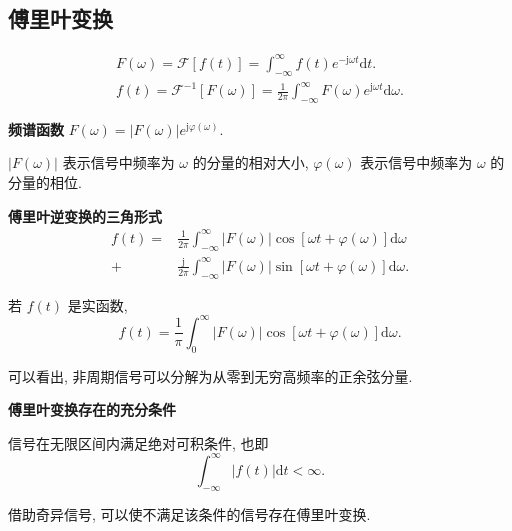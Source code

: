 \subsection{傅里叶变换} \label{3 傅里叶变换}
\rmg
\begin{gather}
    F(\omega)=\mathcal{F}[f(t)]=\int_{-\infty}^{\infty}f(t)e^{-\mathrm{j}\omega t}\mathrm{d}t. \label{eq:3.3 fourier} \\
    f(t)=\mathcal{F}^{-1}[F(\omega)]=\frac{1}{2\pi}\int_{-\infty}^{\infty}F(\omega)e^{\mathrm{j}\omega t}\mathrm{d}\omega.
\end{gather}

\textbf{频谱函数} $F(\omega)=|F(\omega)|e^{\mathrm{j}\varphi(\omega)}$.

$|F(\omega)|$ 表示信号中频率为 $\omega$ 的分量的相对大小, $\varphi(\omega)$ 表示信号中频率为 $\omega$ 的分量的相位.

\textbf{傅里叶逆变换的三角形式}
\begin{equation}
    \begin{aligned}
        f(t)= & \frac{1}{2\pi}\int_{-\infty}^{\infty}|F(\omega)|\cos[\omega t+\varphi(\omega)]\mathrm{d}\omega           \\
        +     & \frac{\mathrm{j}}{2\pi}\int_{-\infty}^{\infty}|F(\omega)|\sin[\omega t+\varphi(\omega)]\mathrm{d}\omega.
    \end{aligned}
\end{equation}

若 $f(t)$ 是实函数,
\begin{equation}
    f(t)=\frac{1}{\pi}\int_{0}^{\infty}|F(\omega)|\cos[\omega t+\varphi(\omega)]\mathrm{d}\omega.
\end{equation}

可以看出, 非周期信号可以分解为从零到无穷高频率的正余弦分量.

\textbf{傅里叶变换存在的充分条件}

信号在无限区间内满足绝对可积条件, 也即
\begin{equation}
    \int_{-\infty}^{\infty}|f(t)|\mathrm{d}t<\infty.
\end{equation}

借助奇异信号, 可以使不满足该条件的信号存在傅里叶变换.
